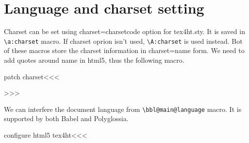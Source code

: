 \section{Language and charset setting}

Charset can be set using charset=charsetcode option for tex4ht.sty. It is saved in \verb|\a:charset| macro. 
If charset oprion isn't used, \verb|\A:charset| is used instead. Bot of these macros store the charset information
in charset=name form. We need to add quotes around name in html5, thus the following macro.

\<patch charset\><<<

\def\:charset:quotes#1=#2.{
  #1="#2"%
}
\def\use:charset{%
  \expandafter\ifx\csname a:charset\endcsname\relax%
    \expandafter\expandafter\expandafter\:charset:quotes\csname A:charset\endcsname.
  \else%
    \expandafter\expandafter\expandafter\:charset:quotes\csname a:charset\endcsname.
  \fi
}
>>>


We can interfere the document language from \verb|\bbl@main@language| macro. It
is supported by both Babel and Polyglossia.

\<configure html5 tex4ht\><<<
\def\Declare:Language#1#2{%
\expandafter\gdef\csname rfclang#1\endcsname{#2}%
}
\def\Get:Language{%
\ifx\bbl@main@language\@undefined en-US%
\else%
\expandafter\ifdefined\csname rfclang\bbl@main@language\endcsname \csname rfclang\bbl@main@language\endcsname\fi%
\fi%
}

